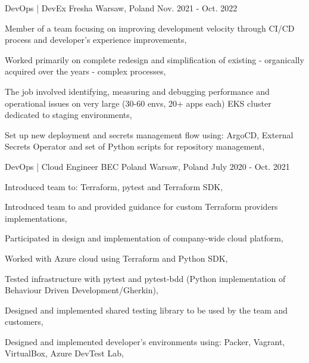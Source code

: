 \begin{cventries}
    \cventry
    {DevOps | DevEx } %
    {Fresha} %
    {Warsaw, Poland} %
    {Nov. 2021 - Oct. 2022} %
    {
        \begin{cvitems} %
            \item {Member of a team focusing on improving development velocity through CI/CD process and developer's experience improvements,}
            \item {Worked primarily on complete redesign and simplification of existing - organically acquired over the years - complex processes,}
            \item {The job involved identifying, measuring and debugging performance and operational issues on very large (30-60 envs, 20+ apps each) EKS cluster dedicated to staging environments,}
            \item {Set up new deployment and secrets management flow using: ArgoCD, External Secrets Operator and set of Python scripts for repository management,}
        \end{cvitems}
    }

    \cventry
    {DevOps | Cloud Engineer} %
    {BEC Poland} %
    {Warsaw, Poland} %
    {July 2020 - Oct. 2021} %
    {
        \begin{cvitems} %
            \item {Introduced team to: Terraform, pytest and Terraform SDK,}
            \item {Introduced team to and provided guidance for custom Terraform providers implementations,}
            \item {Participated in design and implementation of company-wide cloud platform,}
            \item {Worked with Azure cloud using Terraform and Python SDK,}
            \item {Tested infrastructure with pytest and pytest-bdd (Python implementation of Behaviour Driven Development/Gherkin),}
            \item {Designed and implemented shared testing library to be used by the team and customers,}
            \item {Designed and implemented developer's environments using: Packer, Vagrant, VirtualBox, Azure DevTest Lab,}
        \end{cvitems}
    }


\end{cventries}
